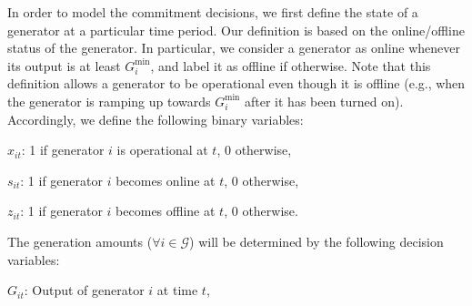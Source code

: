 In order to model the commitment decisions, we first define the state of a generator at a particular time period. Our definition is based on the online/offline status of the generator. In particular, we consider a generator as online whenever its output is at least $G_{i}^{\min}$, and label it as offline if otherwise. Note that this definition allows a generator to be operational even though it is offline (e.g., when the generator is ramping up towards $G_{i}^{\min}$ after it has been turned on). Accordingly, we define the following binary variables:

\begin{description} \setlength{\itemsep}{-1pt}
\item{$x_{it}$:} 1 if generator $i$ is operational at $t$, 0 otherwise,
\item{$s_{it}$:} 1 if generator $i$ becomes online at $t$, 0 otherwise,
\item{$z_{it}$:} 1 if generator $i$ becomes offline at $t$, 0 otherwise.
\end{description}

The generation amounts ($\forall i \in \mathcal{G}$) will be determined by the following decision variables:

\begin{description}\setlength{\itemsep}{-1pt}
\item{$G_{it}$:} Output of generator $i$ at time $t$,
\end{description}

